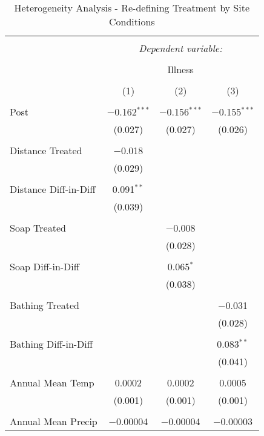 
\begin{table}[!htbp] \centering 
  \caption{Heterogeneity Analysis - Re-defining Treatment by Site Conditions} 
  \label{} 
\begin{tabular}{@{\extracolsep{5pt}}lccc} 
\\[-1.8ex]\hline 
\hline \\[-1.8ex] 
 & \multicolumn{3}{c}{\textit{Dependent variable:}} \\ 
\cline{2-4} 
\\[-1.8ex] & \multicolumn{3}{c}{Illness} \\ 
\\[-1.8ex] & (1) & (2) & (3)\\ 
\hline \\[-1.8ex] 
 Post & $-$0.162$^{***}$ & $-$0.156$^{***}$ & $-$0.155$^{***}$ \\ 
  & (0.027) & (0.027) & (0.026) \\ 
  & & & \\ 
 Distance Treated & $-$0.018 &  &  \\ 
  & (0.029) &  &  \\ 
  & & & \\ 
 Distance Diff-in-Diff & 0.091$^{**}$ &  &  \\ 
  & (0.039) &  &  \\ 
  & & & \\ 
 Soap Treated &  & $-$0.008 &  \\ 
  &  & (0.028) &  \\ 
  & & & \\ 
 Soap Diff-in-Diff &  & 0.065$^{*}$ &  \\ 
  &  & (0.038) &  \\ 
  & & & \\ 
 Bathing Treated &  &  & $-$0.031 \\ 
  &  &  & (0.028) \\ 
  & & & \\ 
 Bathing Diff-in-Diff &  &  & 0.083$^{**}$ \\ 
  &  &  & (0.041) \\ 
  & & & \\ 
 Annual Mean Temp & 0.0002 & 0.0002 & 0.0005 \\ 
  & (0.001) & (0.001) & (0.001) \\ 
  & & & \\ 
 Annual Mean Precip & $-$0.00004 & $-$0.00004 & $-$0.00003 \\ 

\end{tabular}
\end{table}

